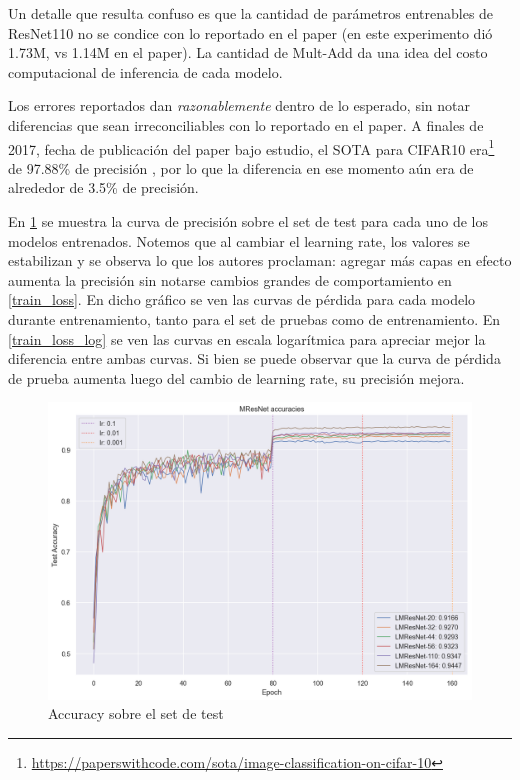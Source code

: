\documentclass[titlepage,a4paper,oneside]{article}
\begin{document}
Un detalle que resulta confuso es que la cantidad de parámetros entrenables de ResNet110 no se condice con lo reportado en el paper (en este experimento dió 1.73M, vs 1.14M en el paper). La cantidad de Mult-Add da una idea del costo computacional de inferencia de cada modelo.

Los errores reportados dan \textit{razonablemente} dentro de lo esperado, sin notar diferencias que sean irreconciliables con lo reportado en el paper. A finales de 2017, fecha de publicación del paper bajo estudio, el SOTA para CIFAR10 era\footnote{\url{https://paperswithcode.com/sota/image-classification-on-cifar-10}} de 97.88\% de precisión \cite{hu2019squeezeandexcitation}, por lo que la diferencia en ese momento aún era de alrededor de 3.5\% de precisión.

En \ref{test_set_acc} se muestra la curva de precisión sobre el set de test para cada uno de los modelos entrenados. Notemos que al cambiar el learning rate, los valores se estabilizan y se observa lo que los autores proclaman: agregar más capas en efecto aumenta la precisión sin notarse cambios grandes de comportamiento en \ref{train_loss}. En dicho gráfico se ven las curvas de pérdida para cada modelo durante entrenamiento, tanto para el set de pruebas como de entrenamiento. En \ref{train_loss_log} se ven las curvas en escala logarítmica para apreciar mejor la diferencia entre ambas curvas. Si bien se puede observar que la curva de pérdida de prueba aumenta luego del cambio de learning rate, su precisión mejora.

\begin{figure}[H]
\centering
\includegraphics[width=\textwidth]{images/accuracy.png}
\caption{Accuracy sobre el set de test}
\label{test_set_acc}
\end{figure}
\end{document}
